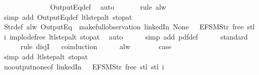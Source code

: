 \begin{isabellebody}
\ \ \ \ \ \ \isamarkupfalse%
\ {}\isanewline
\ \ \ \ \isamarkupfalse%
\ OutputEq{\isacharunderscore}def\ \isamarkupfalse%
\ auto{\isacharbrackleft}{}{\isacharbrackright}\isanewline
\ \ \ \ \ \isamarkupfalse%
\ {\isacharparenleft}rule\ alw{\isacharparenright}\isanewline
\ \ \ \ \ \ \isamarkupfalse%
\ {\isacharparenleft}simp\ add{\isacharcolon}\ OutputEq{\isacharunderscore}def\ ltl{\isacharunderscore}step{\isacharunderscore}alt\ stop{\isacharunderscore}at{\isacharunderscore}{}{\isacharparenright}\isanewline
\ \ \ \ \isamarkupfalse%
\ Str{\isacharunderscore}def\ {\isacartoucheopen}alw\ {\isacharparenleft}OutputEq\ {\isacharbrackleft}{\isacharbrackright}{\isacharparenright}\ {\isacharparenleft}make{\isacharunderscore}full{\isacharunderscore}observation\ linkedIn\ None\ {\isacharparenleft}{\isacharless}{\isachargreater}{\isacharparenleft}{}\ {\isacharcolon}{\isacharequal}\ EFSM{\isachardot}Str\ {\isacharprime}{\isacharprime}free{\isacharprime}{\isacharprime}{\isacharparenright}{\isacharparenright}\ {\isacharparenleft}stl\ i{\isacharparenright}{\isacharparenright}{\isacartoucheclose}\ implode{\isacharunderscore}free\ ltl{\isacharunderscore}step{\isacharunderscore}alt\ stop{\isacharunderscore}at{\isacharunderscore}{}\ \isamarkupfalse%
\ auto{\isacharbrackleft}{}{\isacharbrackright}\isanewline
\ \ \ \ \isamarkupfalse%
\ {\isacharparenleft}simp\ add{\isacharcolon}\ pdf{}{\isacharunderscore}def{\isacharparenright}\isanewline
\ \ \ \ \isamarkupfalse%
\ standard\isanewline
\ \ \ \ \isamarkupfalse%
\ {\isacharparenleft}rule\ disjI{}{\isacharparenright}\isanewline
\ \ \isamarkupfalse%
{\isacharparenleft}coinduction{\isacharparenright}\isanewline
\ \ \ \ \isamarkupfalse%
\ alw\isanewline
\ \ \ \ \isamarkupfalse%
\ \isamarkupfalse%
\ {\isacharquery}case\isanewline
\ \ \ \ \ \ \isamarkupfalse%
\ {\isacharparenleft}simp\ add{\isacharcolon}\ ltl{\isacharunderscore}step{\isacharunderscore}alt\ stop{\isacharunderscore}at{\isacharunderscore}{}{\isacharparenright}\isanewline
\ \ \ \ \isamarkupfalse%
\ no{\isacharunderscore}output{\isacharunderscore}none{\isacharbrackleft}of\ linkedIn\ {\isachardoublequoteopen}{\isacharparenleft}{\isacharless}{\isachargreater}{\isacharparenleft}{}\ {\isacharcolon}{\isacharequal}\ EFSM{\isachardot}Str\ {\isacharprime}{\isacharprime}free{\isacharprime}{\isacharprime}{\isacharparenright}{\isacharparenright}{\isachardoublequoteclose}\ {\isachardoublequoteopen}stl\ {\isacharparenleft}stl\ i{\isacharparenright}{\isachardoublequoteclose}{\isacharbrackright}\isanewline

\end{isabellebody}
